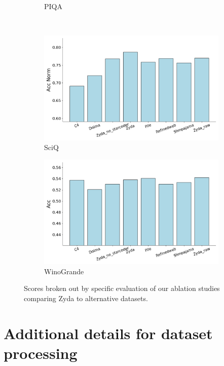 \documentclass{article}
\begin{document}
\begin{figure}[!htb]
\begin{subfigure}{0.45\textwidth}
        \caption{PIQA}
    \end{subfigure}
    \\
    \begin{subfigure}{0.45\textwidth}
        \includegraphics[width=\textwidth]{figures/ablations_per_eval/ablations_evals_Sciq.png}
        \caption{SciQ}
    \end{subfigure}
    \hfill
    \begin{subfigure}{0.45\textwidth}
        \includegraphics[width=\textwidth]{figures/ablations_per_eval/ablations_evals_Winogrande.png}
        \caption{WinoGrande}
    \end{subfigure}
    \caption{Scores broken out by specific evaluation of our ablation studies comparing Zyda to alternative datasets. }
\end{figure}

\newpage

\section{Additional details for dataset processing}
\end{document}

